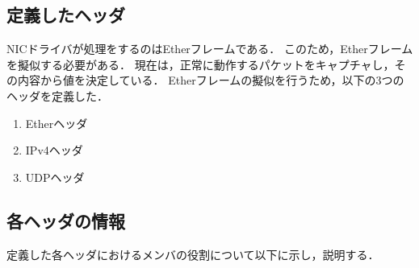 \documentclass[12pt]{jsarticle}
\begin{document}
\subsection{定義したヘッダ}
NICドライバが処理をするのはEtherフレームである．
このため，Etherフレームを擬似する必要がある．
現在は，正常に動作するパケットをキャプチャし，その内容から値を決定している．
Etherフレームの擬似を行うため，以下の3つのヘッダを定義した．
\begin{enumerate}
    \item Etherヘッダ
    \item IPv4ヘッダ
    \item UDPヘッダ
\end{enumerate}

\subsection{各ヘッダの情報}
定義した各ヘッダにおけるメンバの役割について以下に示し，説明する．
\end{document}
